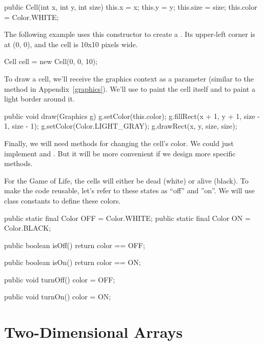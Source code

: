 \begin{code}
public Cell(int x, int y, int size) {
    this.x = x;
    this.y = y;
    this.size = size;
    this.color = Color.WHITE;
}
\end{code}

The following example uses this constructor to create a .
Its upper-left corner is at (0, 0), and the cell is 10x10 pixels wide.

\begin{code}
Cell cell = new Cell(0, 0, 10);
\end{code}

To draw a cell, we'll receive the graphics context as a parameter (similar to the  method in Appendix~\ref{graphics}).
We'll use  to paint the cell itself and  to paint a light border around it.

\begin{code}
public void draw(Graphics g) {
    g.setColor(this.color);
    g.fillRect(x + 1, y + 1, size - 1, size - 1);
    g.setColor(Color.LIGHT_GRAY);
    g.drawRect(x, y, size, size);
}
\end{code}

Finally, we will need methods for changing the cell's color.
We could just implement  and .
But it will be more convenient if we design more specific methods.

For the Game of Life, the cells will either be dead (white) or alive (black).
To make the code reusable, let's refer to these states as ``off'' and ''on''.
We will use class constants to define these colors.

\begin{code}
public static final Color OFF = Color.WHITE;
public static final Color ON = Color.BLACK;

public boolean isOff() {
    return color == OFF;
}

public boolean isOn() {
    return color == ON;
}

public void turnOff() {
    color = OFF;
}

public void turnOn() {
    color = ON;
}
\end{code}


\section{Two-Dimensional Arrays}

